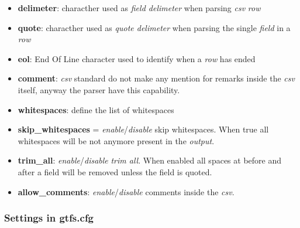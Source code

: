 \documentclass[12pt, a4paper]{book}
\begin{document}
\begin{itemize}
\item \textbf{delimeter}: characther used as \textit{field delimeter} when parsing \textit{csv} \textit{row}
\item \textbf{quote}: characther used as \textit{quote delimeter} when parsing the single \textit{field} in a \textit{row}
\item \textbf{eol}: End Of Line character used to identify when a \textit{row} has ended
\item \textbf{comment}: \textit{csv} standard do not make any mention for remarks inside the \textit{csv} itself, anyway the parser have this capability. 
\item \textbf{whitespaces}: define the list of whitespaces
\item \textbf{skip\_whitespaces} = \textit{enable}/\textit{disable} skip whitespaces. When true all whitespaces will be not anymore present in the \textit{output}.
\item \textbf{trim\_all}: \textit{enable}/\textit{disable} \textit{trim all}. When enabled all spaces at before and after a field will be removed unless the field is quoted.
\item \textbf{allow\_comments}: \textit{enable}/\textit{disable} comments inside the \textit{csv}.
\end{itemize}

\subsubsection{Settings in gtfs.cfg}

\begin{justify}
\end{justify}
\end{document}
